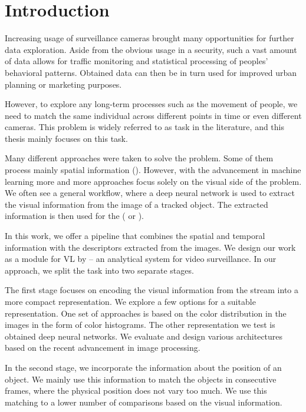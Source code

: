 \chapter*{Introduction}

\label{ch:intro}

Increasing usage of surveillance cameras brought many opportunities for further data exploration. Aside from the obvious usage in a security, such a vast amount of data allows for traffic monitoring and statistical processing of peoples' behavioral patterns. Obtained data can then be in turn used for improved urban planning or marketing purposes.

However, to explore any long-term processes such as the movement of people, we need to match the same individual across different points in time or even different cameras. This problem is widely referred to as \reid{} task in the literature, and this thesis mainly focuses on this task.

Many different approaches were taken to solve the \reid{} problem. Some of them process mainly spatial information (\cite{hu2006principal}). However, with the advancement in machine learning more and more approaches focus solely on the visual side of the problem. We often see a general workflow, where a deep neural network is used to extract the visual information from the image of a tracked object. The extracted information is then used for the \reid{} (\cite{ding2015deep} or \cite{cheng2016person}).

In this work, we offer a \reid{} pipeline that combines the spatial and temporal information with the descriptors extracted from the images. We design our work as a module for \gls{VL} by \cite{videolytics} -- an analytical system for video surveillance. In our approach, we split the task into two separate stages.

The first stage focuses on encoding the visual information from the stream into a more compact representation. We explore a few options for a suitable representation. One set of approaches is based on the color distribution in the images in the form of color histograms. The other representation we test is obtained deep neural networks. We evaluate and design various architectures based on the recent advancement in image processing.

In the second stage, we incorporate the information about the position of an object. We mainly use this information to match the objects in consecutive frames, where the physical position does not vary too much. We use this matching to a lower number of comparisons based on the visual information.

